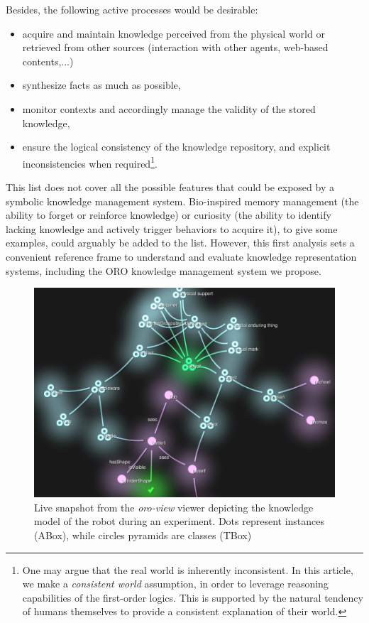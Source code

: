 \documentclass[twocolumn]{svjour3}
\begin{document}
Besides, the following active processes would be desirable:
\begin{itemize}
	\item acquire and maintain knowledge perceived from the physical world or
	retrieved from other sources (interaction with other agents, web-based contents,...)
	\item synthesize facts as much as possible,
	\item monitor contexts and accordingly manage the validity of the stored knowledge,
	\item ensure the logical consistency of the knowledge repository, and
	explicit inconsistencies when required\footnote{One may argue that the real world is 
	inherently inconsistent. In this article, we make a
	\textit{consistent world} assumption, in order to leverage reasoning
	capabilities of the first-order logics. This is supported by the natural
	tendency of humans themselves to provide a consistent explanation of their
	world.}.
\end{itemize}

This list does not cover all the possible features that could be exposed by a
symbolic knowledge management system. Bio-inspired memory management (the
ability to forget or reinforce knowledge) or curiosity (the ability to
identify lacking knowledge and actively trigger behaviors to acquire
it), to give some examples, could arguably be added to the
list. However, this first analysis sets a convenient reference frame to
understand and evaluate knowledge representation systems, including the
\textsc{ORO} knowledge management system we propose.

\begin{figure}[!ht]
\centering
  \includegraphics[width=\columnwidth]{images/snapshot_oroview.png}
  \caption{Live snapshot from the \emph{oro-view} viewer depicting the
  knowledge model of the robot during an experiment. Dots represent
  instances (ABox), while circles pyramids are classes (TBox)}
  \label{fig|oro-view}
\end{figure}
\end{document}
